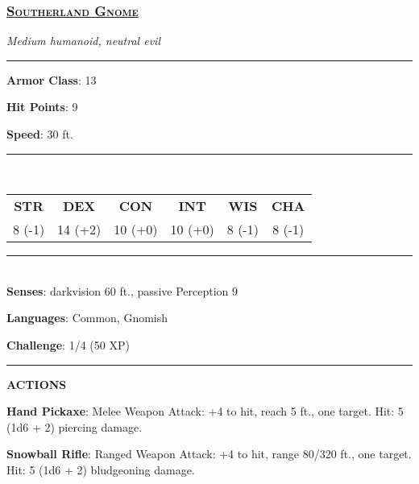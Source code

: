\subsubsection*{\underline{\textsc{\Large Southerland Gnome}}}
\noindent\emph{Medium humanoid, neutral evil}

\noindent\rule{0.5\textwidth}{0.5pt}

\noindent\textbf{Armor Class}: 13

\noindent\textbf{Hit Points}: 9

\noindent\textbf{Speed}: 30 ft.

\noindent\rule{0.5\textwidth}{0.5pt} \\
\begin{table}[H]
	\begin{tabular}{cccccc}
		\textbf{STR} & \textbf{DEX} & \textbf{CON} & \textbf{INT} & \textbf{WIS} & \textbf{CHA} \\
		8 (-1) & 14 (+2) & 10 (+0) & 10 (+0) & 8 (-1) & 8 (-1) \\
	\end{tabular}
\end{table}
\noindent\rule{0.5\textwidth}{0.5pt} \\

\noindent\textbf{Senses}: darkvision 60 ft., passive Perception 9

\noindent\textbf{Languages}: Common, Gnomish

\noindent\textbf{Challenge}: 1/4 (50 XP)

\noindent\rule{0.5\textwidth}{0.5pt}

\noindent\textbf{ACTIONS}

\noindent\textbf{Hand Pickaxe}: Melee Weapon Attack: +4 to hit, reach 5 ft., one target. Hit: 5 (1d6 + 2) piercing damage.

\noindent\textbf{Snowball Rifle}:  Ranged Weapon Attack: +4 to hit, range 80/320 ft., one target. Hit: 5 (1d6 + 2) bludgeoning damage.